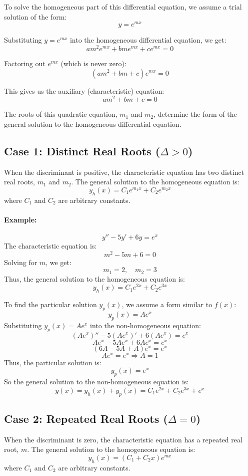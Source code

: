 \documentclass[a4paper,12pt]{article}
\begin{document}
To solve the homogeneous part of this differential equation, we assume a trial solution of the form:
\[
y = e^{mx}
\]

Substituting \(y = e^{mx}\) into the homogeneous differential equation, we get:
\[
a m^2 e^{mx} + b m e^{mx} + c e^{mx} = 0
\]

Factoring out \( e^{mx} \) (which is never zero):
\[
(a m^2 + b m + c) e^{mx} = 0
\]

This gives us the auxiliary (characteristic) equation:
\[
a m^2 + b m + c = 0
\]

The roots of this quadratic equation, \( m_1 \) and \( m_2 \), determine the form of the general solution to the homogeneous differential equation.

\subsection*{Case 1: Distinct Real Roots (\(\Delta > 0\))}
When the discriminant is positive, the characteristic equation has two distinct real roots, \(m_1\) and \(m_2\). The general solution to the homogeneous equation is:\\
\[
y_h(x) = C_1 e^{m_1 x} + C_2 e^{m_2 x}
\]
where \(C_1\) and \(C_2\) are arbitrary constants.

\paragraph{Example:}
\[
y'' - 5y' + 6y = e^x
\]
The characteristic equation is:
\[
m^2 - 5m + 6 = 0
\]
Solving for \(m\), we get:
\[
m_1 = 2, \quad m_2 = 3
\]
Thus, the general solution to the homogeneous equation is:
\[
y_h(x) = C_1 e^{2x} + C_2 e^{3x}
\]

To find the particular solution \(y_p(x)\), we assume a form similar to \(f(x)\):
\[
y_p(x) = A e^x
\]
Substituting \(y_p(x) = A e^x\) into the non-homogeneous equation:
\[
(A e^x)'' - 5(A e^x)' + 6(A e^x) = e^x
\]
\[
A e^x - 5A e^x + 6A e^x = e^x
\]
\[
(6A - 5A + A) e^x = e^x
\]
\[
A e^x = e^x \Rightarrow A = 1
\]
Thus, the particular solution is:
\[
y_p(x) = e^x
\]
So the general solution to the non-homogeneous equation is:
\[
y(x) = y_h(x) + y_p(x) = C_1 e^{2x} + C_2 e^{3x} + e^x
\]

\subsection*{Case 2: Repeated Real Roots (\(\Delta = 0\))}
When the discriminant is zero, the characteristic equation has a repeated real root, \(m\). The general solution to the homogeneous equation is:
\[
y_h(x) = (C_1 + C_2 x) e^{m x}
\]
where \(C_1\) and \(C_2\) are arbitrary constants.
\end{document}

